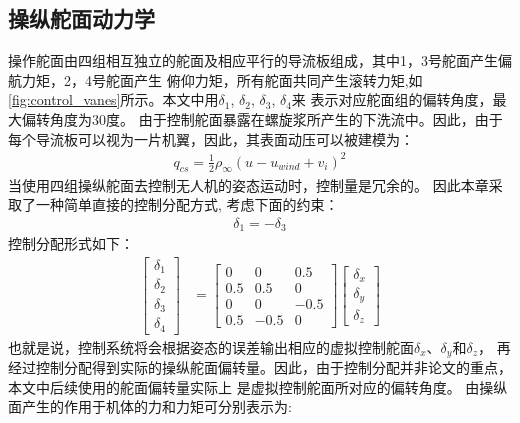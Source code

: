 \subsection{操纵舵面动力学}
操作舵面由四组相互独立的舵面及相应平行的导流板组成，其中1，3号舵面产生偏航力矩，2，4号舵面产生
俯仰力矩，所有舵面共同产生滚转力矩,如\autoref{fig:control_vanes}所示。本文中用$\delta_{1}$, $\delta_{2}$, $\delta_{3}$, $\delta_{4}$来
表示对应舵面组的偏转角度，最大偏转角度为30度。
由于控制舵面暴露在螺旋浆所产生的下洗流中。因此，由于每个导流板可以视为一片机翼，因此，其表面动压可以被建模为：
\begin{align}
    q_{cs}=\frac{1}{2} \rho_{\infty}\left(u-u_{wind}+v_{i}\right)^{2}
\end{align}
当使用四组操纵舵面去控制无人机的姿态运动时，控制量是冗余的。
因此本章采取了一种简单直接的控制分配方式\cite{zhang2013new}, 考虑下面的约束：
\begin{align}
    \delta_{1} = -\delta_{3}
\end{align}
控制分配形式如下：
\begin{align}
    \left[\begin{array}{l}
    \delta_{1} \\
    \delta_{2} \\
    \delta_{3} \\
    \delta_{4}
    \end{array}\right] & = \left[\begin{array}{ccc}
    0 & 0 & 0.5 \\
    0.5 & 0.5 & 0 \\
    0 & 0 & -0.5 \\
    0.5 & -0.5 & 0
    \end{array}\right]\left[\begin{array}{l}
    \delta_{x} \\
    \delta_{y} \\
    \delta_{z}
    \end{array}\right]
\end{align}
也就是说，控制系统将会根据姿态的误差输出相应的虚拟控制舵面$\delta_{x}$、$\delta_{y}$和$\delta_{z}$，
再经过控制分配得到实际的操纵舵面偏转量。因此，由于控制分配并非论文的重点，本文中后续使用的舵面偏转量实际上
是虚拟控制舵面所对应的偏转角度。
由操纵面产生的作用于机体的力和力矩可分别表示为:
